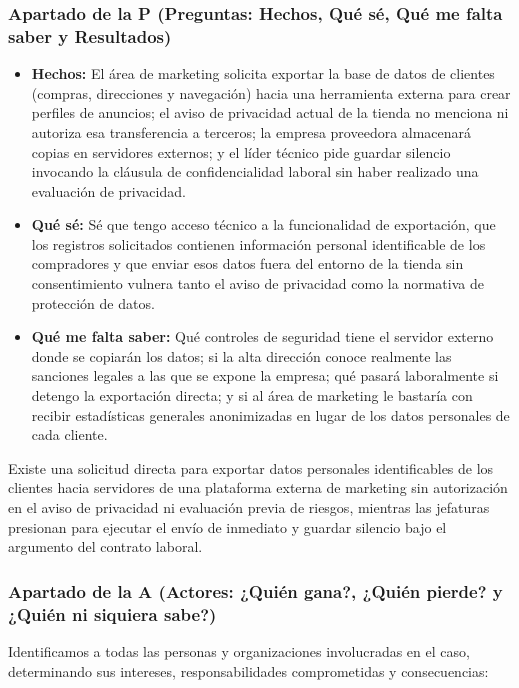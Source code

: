 \documentclass[12pt,a4paper,oneside]{article}
\begin{document}
\subsubsection{Apartado de la P (Preguntas: Hechos, Qué sé, Qué me falta saber y Resultados)}
\begin{itemize}[leftmargin=1.8em,itemsep=4pt]
    \item \textbf{Hechos:} El área de marketing solicita exportar la base de datos de clientes (compras, direcciones y navegación) hacia una herramienta externa para crear perfiles de anuncios; el aviso de privacidad actual de la tienda no menciona ni autoriza esa transferencia a terceros; la empresa proveedora almacenará copias en servidores externos; y el líder técnico pide guardar silencio invocando la cláusula de confidencialidad laboral sin haber realizado una evaluación de privacidad.
    \item \textbf{Qué sé:} Sé que tengo acceso técnico a la funcionalidad de exportación, que los registros solicitados contienen información personal identificable de los compradores y que enviar esos datos fuera del entorno de la tienda sin consentimiento vulnera tanto el aviso de privacidad como la normativa de protección de datos.
    \item \textbf{Qué me falta saber:} Qué controles de seguridad tiene el servidor externo donde se copiarán los datos; si la alta dirección conoce realmente las sanciones legales a las que se expone la empresa; qué pasará laboralmente si detengo la exportación directa; y si al área de marketing le bastaría con recibir estadísticas generales anonimizadas en lugar de los datos personales de cada cliente.
\end{itemize}

\begin{resultado}
Existe una solicitud directa para exportar datos personales identificables de los clientes hacia servidores de una plataforma externa de marketing sin autorización en el aviso de privacidad ni evaluación previa de riesgos, mientras las jefaturas presionan para ejecutar el envío de inmediato y guardar silencio bajo el argumento del contrato laboral.
\end{resultado}

\subsubsection{Apartado de la A (Actores: ¿Quién gana?, ¿Quién pierde? y ¿Quién ni siquiera sabe?)}
Identificamos a todas las personas y organizaciones involucradas en el caso, determinando sus intereses, responsabilidades comprometidas y consecuencias:
\end{document}
